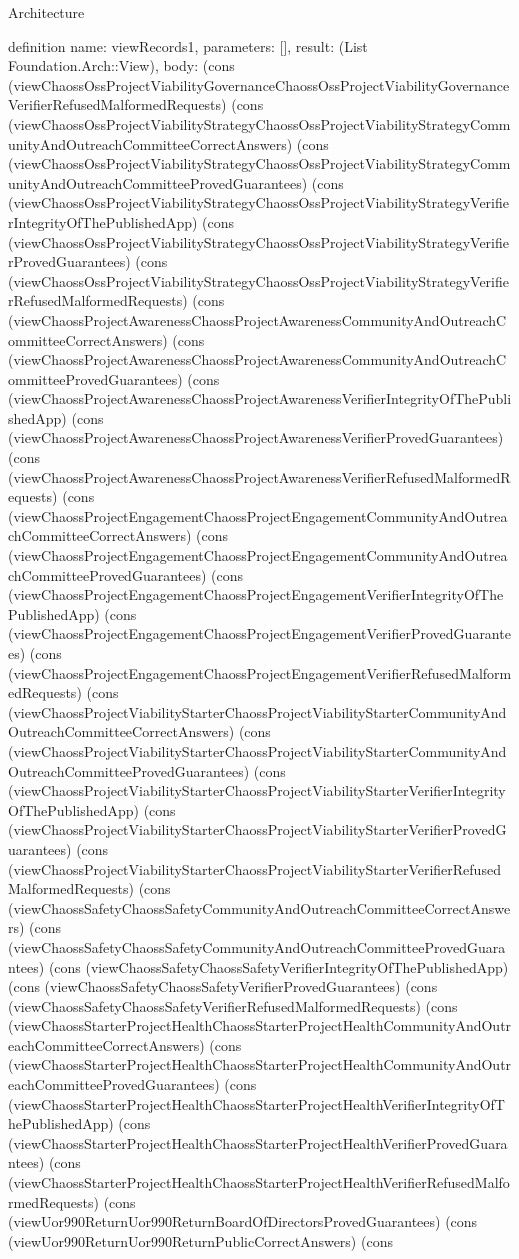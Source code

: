 \begin{lexlean}{Architecture}
\begin{semanticmodule}
definition{
  name: viewRecords1,
  parameters: [],
  result: (List Foundation.Arch::View),
  body: (cons (viewChaossOssProjectViabilityGovernanceChaossOssProjectViabilityGovernanceVerifierRefusedMalformedRequests) (cons (viewChaossOssProjectViabilityStrategyChaossOssProjectViabilityStrategyCommunityAndOutreachCommitteeCorrectAnswers) (cons (viewChaossOssProjectViabilityStrategyChaossOssProjectViabilityStrategyCommunityAndOutreachCommitteeProvedGuarantees) (cons (viewChaossOssProjectViabilityStrategyChaossOssProjectViabilityStrategyVerifierIntegrityOfThePublishedApp) (cons (viewChaossOssProjectViabilityStrategyChaossOssProjectViabilityStrategyVerifierProvedGuarantees) (cons (viewChaossOssProjectViabilityStrategyChaossOssProjectViabilityStrategyVerifierRefusedMalformedRequests) (cons (viewChaossProjectAwarenessChaossProjectAwarenessCommunityAndOutreachCommitteeCorrectAnswers) (cons (viewChaossProjectAwarenessChaossProjectAwarenessCommunityAndOutreachCommitteeProvedGuarantees) (cons (viewChaossProjectAwarenessChaossProjectAwarenessVerifierIntegrityOfThePublishedApp) (cons (viewChaossProjectAwarenessChaossProjectAwarenessVerifierProvedGuarantees) (cons (viewChaossProjectAwarenessChaossProjectAwarenessVerifierRefusedMalformedRequests) (cons (viewChaossProjectEngagementChaossProjectEngagementCommunityAndOutreachCommitteeCorrectAnswers) (cons (viewChaossProjectEngagementChaossProjectEngagementCommunityAndOutreachCommitteeProvedGuarantees) (cons (viewChaossProjectEngagementChaossProjectEngagementVerifierIntegrityOfThePublishedApp) (cons (viewChaossProjectEngagementChaossProjectEngagementVerifierProvedGuarantees) (cons (viewChaossProjectEngagementChaossProjectEngagementVerifierRefusedMalformedRequests) (cons (viewChaossProjectViabilityStarterChaossProjectViabilityStarterCommunityAndOutreachCommitteeCorrectAnswers) (cons (viewChaossProjectViabilityStarterChaossProjectViabilityStarterCommunityAndOutreachCommitteeProvedGuarantees) (cons (viewChaossProjectViabilityStarterChaossProjectViabilityStarterVerifierIntegrityOfThePublishedApp) (cons (viewChaossProjectViabilityStarterChaossProjectViabilityStarterVerifierProvedGuarantees) (cons (viewChaossProjectViabilityStarterChaossProjectViabilityStarterVerifierRefusedMalformedRequests) (cons (viewChaossSafetyChaossSafetyCommunityAndOutreachCommitteeCorrectAnswers) (cons (viewChaossSafetyChaossSafetyCommunityAndOutreachCommitteeProvedGuarantees) (cons (viewChaossSafetyChaossSafetyVerifierIntegrityOfThePublishedApp) (cons (viewChaossSafetyChaossSafetyVerifierProvedGuarantees) (cons (viewChaossSafetyChaossSafetyVerifierRefusedMalformedRequests) (cons (viewChaossStarterProjectHealthChaossStarterProjectHealthCommunityAndOutreachCommitteeCorrectAnswers) (cons (viewChaossStarterProjectHealthChaossStarterProjectHealthCommunityAndOutreachCommitteeProvedGuarantees) (cons (viewChaossStarterProjectHealthChaossStarterProjectHealthVerifierIntegrityOfThePublishedApp) (cons (viewChaossStarterProjectHealthChaossStarterProjectHealthVerifierProvedGuarantees) (cons (viewChaossStarterProjectHealthChaossStarterProjectHealthVerifierRefusedMalformedRequests) (cons (viewUor990ReturnUor990ReturnBoardOfDirectorsProvedGuarantees) (cons (viewUor990ReturnUor990ReturnPublicCorrectAnswers) (cons }
\end{semanticmodule}
\end{lexlean}
